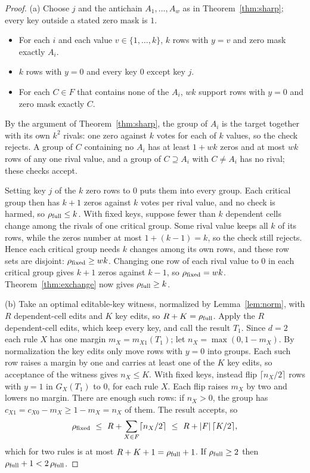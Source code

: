 \documentclass[11pt]{article}
\theoremstyle{remark}
\newcommand{\rfull}{\rho_{\rm full}}
\newcommand{\rfix}{\rho_{\rm fixed}}
\begin{document}
\begin{proof}
(a) Choose $j$ and the antichain $A_1,\ldots,A_w$ as in
Theorem~\ref{thm:sharp}; every key outside a stated zero mask is $1$.
\begin{itemize}
\item For each $i$ and each value $v\in\{1,\ldots,k\}$, $k$ rows with $y=v$ and
zero mask exactly $A_i$.
\item $k$ rows with $y=0$ and every key $0$ except key $j$.
\item For each $C\in F$ that contains none of the $A_i$, $wk$ support rows with
$y=0$ and zero mask exactly $C$.
\end{itemize}
By the argument of Theorem~\ref{thm:sharp}, the group of $A_i$ is the target
together with its own $k^2$ rivals: one zero against $k$ votes for each of $k$
values, so the check rejects. A group of $C$ containing no $A_i$ has at least
$1+wk$ zeros and at most $wk$ rows of any one rival value, and a group of
$C\supseteq A_i$ with $C\ne A_i$ has no rival; these checks accept.

Setting key $j$ of the $k$ zero rows to $0$ puts them into every group. Each
critical group then has $k+1$ zeros against $k$ votes per rival value, and no
check is harmed, so $\rfull\le k$. With fixed keys, suppose fewer than $k$
dependent cells change among the rivals of one critical group. Some rival value
keeps all $k$ of its rows, while the zeros number at most $1+(k-1)=k$, so the
check still rejects. Hence each critical group needs $k$ changes among its own
rows, and these row sets are disjoint: $\rfix\ge wk$. Changing one row of each
rival value to $0$ in each critical group gives $k+1$ zeros against $k-1$, so
$\rfix=wk$. Theorem~\ref{thm:exchange} now gives $\rfull\ge k$.

(b) Take an optimal editable-key witness, normalized by Lemma~\ref{lem:norm},
with $R$ dependent-cell edits and $K$ key edits, so $R+K=\rfull$. Apply the $R$
dependent-cell edits, which keep every key, and call the result $T_1$. Since
$d=2$ each rule $X$ has one margin $m_X=m_{X1}(T_1)$; let
$n_X=\max(0,1-m_X)$. By normalization the key edits only move rows with $y=0$
into groups. Each such row raises a margin by one and carries at least one of
the $K$ key edits, so acceptance of the witness gives $n_X\le K$. With fixed
keys, instead flip $\lceil n_X/2\rceil$ rows with $y=1$ in $G_X(T_1)$ to $0$,
for each rule $X$. Each flip raises $m_X$ by two and lowers no margin. There
are enough such rows: if $n_X>0$, the group has
$c_{X1}=c_{X0}-m_X\ge1-m_X=n_X$ of them. The result accepts, so
\[
 \rfix\ \le\ R+\sum_{X\in F}\lceil n_X/2\rceil\ \le\ R+|F|\,\lceil K/2\rceil ,
\]
which for two rules is at most $R+K+1=\rfull+1$. If $\rfull\ge2$ then
$\rfull+1<2\,\rfull$.
\end{proof}
\end{document}

